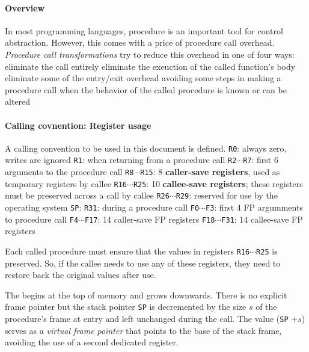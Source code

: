 \documentclass{memo}
\begin{document}
\small
{}

\paragraph{Overview} In most programming languages, procedure is an important
tool for control abstraction. However, this comes with a price of procedure
call overhead. {\em Procedure call transformations\/} try to reduce this
overhead in one of four ways:
\bit
\w eliminate the call entirely
\w eliminate the exeuction of the called function's body
\w eliminate some of the entry/exit overhead
\w avoiding some steps in making a procedure call when the behavior of the
called procedure is known or can be altered
\eit

\paragraph{Calling covnention: Register usage}
A calling convention to be used in this document is defined. 
\bit
\w \verb+R0+: always zero, writes are ignored
\w \verb+R1+:  when returning from a procedure call
\w \verb+R2+$\cdots$\verb+R7+: first 6 arguments to the procedure call
\w \verb+R8+$\cdots$\verb+R15+: 8 {\bf caller-save registers\/}, used as
temporary registers by callee
\w \verb+R16+$\cdots$\verb+R25+: 10 {\bf callee-save registers\/}; these
registers must be preserved across a call by callee 
\w \verb+R26+$\cdots$\verb+R29+: reserved for use by the operating system
\w \verb+SP+: 
\w \verb+R31+:  during a procedure call
\w \verb+F0+$\cdots$\verb+F3+: first 4 FP argumments to procedure call
\w \verb+F4+$\cdots$\verb+F17+: 14 caller-save FP registers
\w \verb+F18+$\cdots$\verb+F31+: 14 callee-save FP registers
\eit

Each called procedure must ensure that the values in registers
\verb+R16+$\cdots$\verb+R25+ is preserved. So, if the callee needs to use any
of these registers, they need to restore back the original values after use. 

The  begins at the top of memory and grows downwards. There is no
explicit frame pointer but the stack pointer \verb+SP+ is decremented by the
size $s$ of the procedure's frame at entry and left unchanged during the call.
The value (\verb+SP+ $+ s$) serves as a {\em virtual frame pointer} that
points to the base of the stack frame, avoiding the use of a second dedicated
register. 
\end{document}
